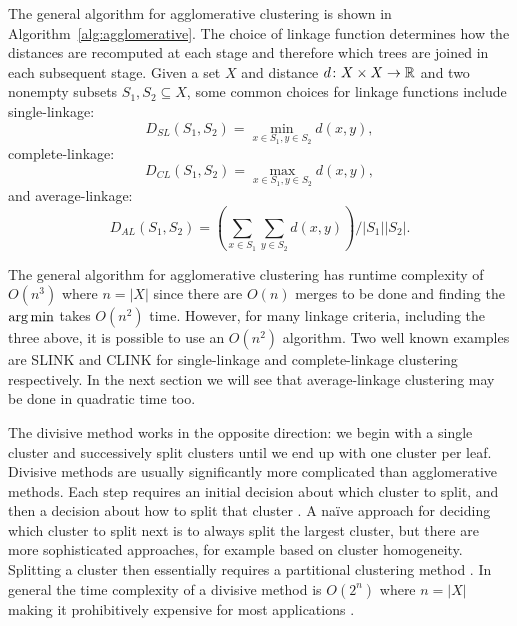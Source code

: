 The general algorithm for agglomerative clustering is shown in
Algorithm~\ref{alg:agglomerative}.  The choice of linkage function determines
how the distances are recomputed at each stage and therefore which trees are
joined in each subsequent stage.  Given a set $X$ and distance $d \colon X
\times X \to {\mathbb R}$ and two nonempty subsets $S_1,S_2 \subseteq X$, some common
choices for linkage functions include single-linkage:
\begin{equation*}
  \label{eq:slink}
  D_{SL}(S_1,S_2) = \min_{x \in S_1, y \in S_2} d(x,y),
\end{equation*}
complete-linkage:
\begin{equation*}
  \label{eq:clink}
  D_{CL}(S_1,S_2) = \max_{x \in S_1, y \in S_2} d(x,y),
\end{equation*}
and average-linkage:
\begin{equation*}
  \label{eq:alink}
  D_{AL}(S_1,S_2) = \left( \sum_{x \in S_1} \sum_{y \in S_2} d(x,y) \right) / |S_1| |S_2|.
\end{equation*}

The general algorithm for agglomerative clustering has runtime complexity of
$O(n^3)$ where $n = |X|$ since there are $O(n)$ merges to be done and finding
the $\operatorname*{arg\,min}$ takes $O(n^2)$ time.  However, for many linkage criteria,
including the three above, it is possible to use an $O(n^2)$ algorithm.  Two
well known examples are SLINK \cite{sibson1973slink} and CLINK
\cite{defays1977efficient} for single-linkage and complete-linkage clustering
respectively.  In the next section we will see that average-linkage clustering
may be done in quadratic time too.

The divisive method works in the opposite direction: we begin with a single
cluster and successively split clusters until we end up with one cluster per
leaf.  Divisive methods are usually significantly more complicated than
agglomerative methods.  Each step requires an initial decision about which
cluster to split, and then a decision about how to split that cluster
\cite{savaresi2002cluster}.  A naïve approach for deciding which cluster to
split next is to always split the largest cluster, but there are more
sophisticated approaches, for example based on cluster homogeneity.  Splitting
a cluster then essentially requires a partitional clustering method
\cite{ding2002cluster}.  In general the time complexity of a divisive method
is $O(2^n)$ where $n = |X|$ making it prohibitively expensive for most
applications \cite{cimiano2004comparing}.

